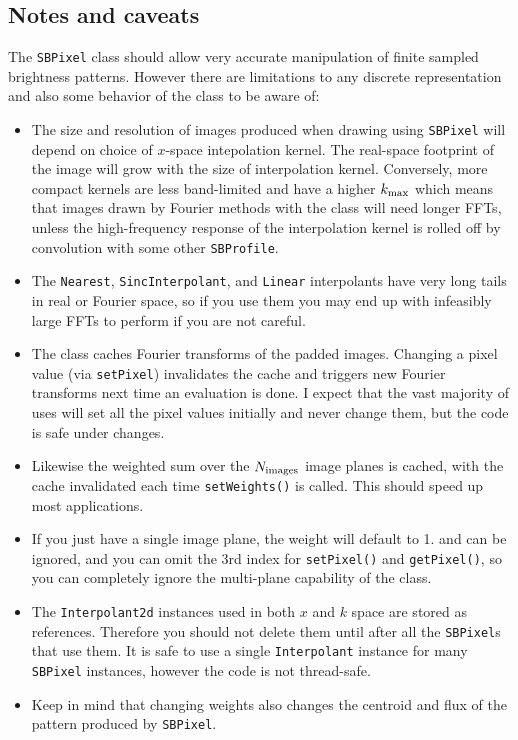 \documentclass[11pt,preprint,flushrt]{aastex}
\begin{document}
\subsection{Notes and caveats}
The {\tt SBPixel} class should allow very accurate manipulation of finite sampled brightness patterns.  However there are limitations to any discrete representation and also some behavior of the class to be aware of:
\begin{itemize}
\item The size and resolution of images produced when drawing using {\tt SBPixel} will depend on choice of $x$-space intepolation kernel.   The real-space footprint of the image will grow with the size of interpolation kernel.  Conversely, more compact kernels are less band-limited and have a higher $k_{\rm max}$ which means that images drawn by Fourier methods with the class will need longer FFTs, unless the high-frequency response of the interpolation kernel is rolled off by convolution with some other {\tt SBProfile}.  
\item The {\tt Nearest},  {\tt SincInterpolant}, and {\tt Linear} interpolants have very long tails in real or Fourier space, so if you use them you may end up with infeasibly large FFTs to perform if you are not careful. 
\item The class caches Fourier transforms of the padded images.  Changing a pixel value (via {\tt setPixel}) invalidates the cache and triggers new Fourier transforms next time an evaluation is done.  I expect that the vast majority of uses will set all the pixel values initially and never change them, but the code is safe under changes.
\item Likewise the weighted sum over the $N_{\rm images}$ image planes is cached, with the cache invalidated each time {\tt setWeights()} is called.  This should speed up most applications.
\item If you just have a single image plane, the weight will default to 1. and can be ignored, and you can omit the 3rd index for {\tt setPixel()} and {\tt getPixel()}, so you can completely ignore the multi-plane capability of the class.
\item The {\tt Interpolant2d} instances used in both $x$ and $k$ space are stored as references.  Therefore you should not delete them until after all the {\tt SBPixel}s that use them.  It is safe to use a single {\tt Interpolant} instance for many {\tt SBPixel} instances, however the code is not thread-safe.
\item Keep in mind that changing weights also changes the centroid and flux of the pattern produced by {\tt SBPixel}.
\end{itemize}
\end{document}
